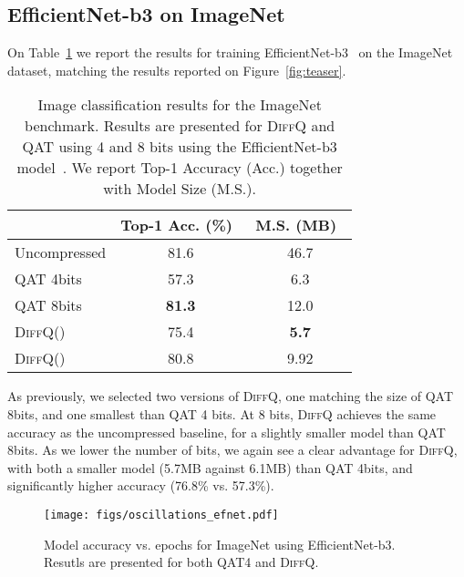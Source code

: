 \documentclass{article}
\newcommand{\diffq}{\textsc{DiffQ}\xspace}
\begin{document}
\vspace{-0.2cm}
\subsection{EfficientNet-b3 on ImageNet}
\vspace{-0.1cm}
\label{supp:imnet}
On Table~\ref{supp:imagenet} we report the results for training
EfficientNet-b3~\cite{tan2019efficientnet} on the ImageNet dataset, matching the results reported on Figure~\ref{fig:teaser}.

\begin{table}[h!]
\caption{Image classification results for the ImageNet benchmark. Results are presented for \diffq and QAT using 4 and 8 bits using the EfficientNet-b3 model~\citep{tan2019efficientnet}. We report Top-1 Accuracy (Acc.) together with Model Size (M.S.).}
\label{supp:imagenet}
\vskip 0.15in
\begin{center}
\begin{small}
\begin{sc}
\begin{tabular}{l|cc}
\toprule
		& Top-1 Acc. (\%)~ & M.S. (MB)~ \\
\midrule
Uncompressed    	                & 81.6 		   & 46.7 \\
\midrule
QAT 4bits    		                &  57.3        & 6.3  \\
QAT 8bits    		                & \textbf{81.3}         & 12.0 \\
\midrule
\diffq ()  	                & 75.4      & \textbf{5.7} \\
\diffq ()  	    & 80.8      & 9.92  \\
\bottomrule
\end{tabular}
\end{sc}
\end{small}
\end{center}
\vskip -0.1in
\end{table}

As previously, we selected two versions of \diffq, one matching the size of QAT 8bits, and one smallest than QAT 4 bits. At 8 bits, \diffq achieves the same accuracy as the uncompressed baseline, for a slightly smaller model than QAT 8bits. As we lower the number of bits, we again see a clear advantage for \diffq, with both a smaller model (5.7MB against 6.1MB) than QAT 4bits, and significantly higher accuracy (76.8\% vs. 57.3\%).

\begin{figure}[t!]
\vskip 0.2in
\begin{center}
\centerline{\texttt{[image: figs/oscillations\_efnet.pdf]}}
\caption{Model accuracy vs. epochs for ImageNet using EfficientNet-b3. Resutls are presented for both QAT4 and \diffq.}
\label{fig:app_oscillations}
\end{center}
\vskip -0.35in
\end{figure}
\end{document}
